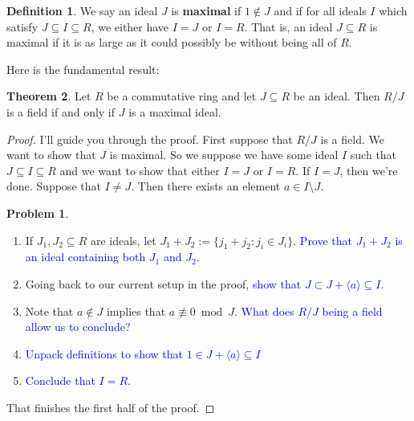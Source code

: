 \documentclass[11pt]{article}
\theoremstyle{definition}
\newtheorem{theorem}{Theorem}[section]
\newtheorem{definition}[theorem]{Definition}
\newtheorem{problem}{Problem}[section]
\numberwithin{equation}{subsection}
\newcommand{\blue}[1]{\textcolor{blue}{#1}}
\begin{document}
\begin{definition}
    We say an ideal $J$ is \textbf{maximal} if $1 \notin J$ and if for all ideals $I$ which satisfy $J \subseteq I \subseteq R$, we either have $I = J$ or $I = R$.    
    That is, an ideal $J \subseteq R$ is maximal if it is as large as it could possibly be without being all of $R$.
\end{definition}

Here is the fundamental result:

\begin{theorem}
\label{thm: maximal field}
    Let $R$ be a commutative ring and let $J \subseteq R$ be an ideal.
    Then $R/J$ is a field if and only if $J$ is a maximal ideal.
\end{theorem}

\begin{proof}
    I'll guide you through the proof.
    First suppose that $R/J$ is a field.
    We want to show that $J$ is maximal.
    So we suppose we have some ideal $I$ such that $J \subseteq I \subseteq R$ and we want to show that either $I = J$ or $I = R$.
    If $I = J$, then we're done.
    Suppose that $I \neq J$.
    Then there exists an element $a \in I \setminus J$.

    \begin{problem}
    \,
        \begin{enumerate}
            \item If $J_1, J_2 \subseteq R$ are ideals, let $J_1 + J_2 := \{j_1 + j_2 : j_i \in J_i\}$.
            \blue{Prove that $J_1 + J_2$ is an ideal containing both $J_1$ and $J_2$.}

            \item Going back to our current setup in the proof, \blue{show that $J \subset J + \langle a \rangle \subseteq I$.}

            \item Note that $a \notin J$ implies that $a \not\equiv 0 \bmod J$.
            \blue{What does $R/J$ being a field allow us to conclude?}

            \item \blue{Unpack definitions to show that $1 \in J + \langle a\rangle \subseteq I$}

            \item \blue{Conclude that $I = R$.}
        \end{enumerate}
    \end{problem}
    That finishes the first half of the proof.


\end{proof}
\end{document}

